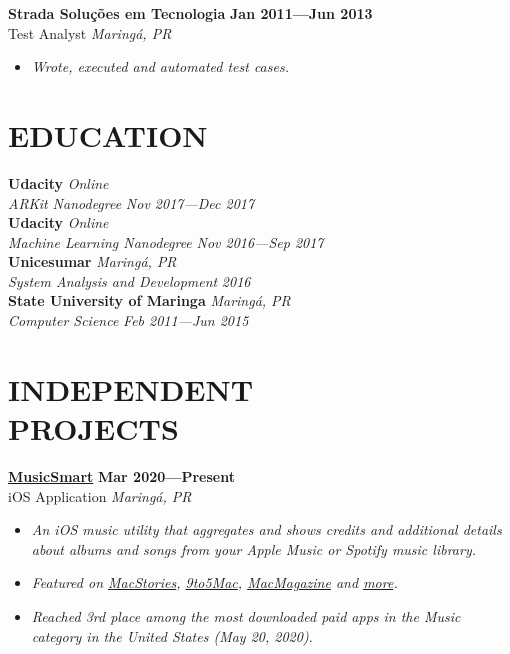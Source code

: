 \documentclass[line,margin]{res}
\begin{document}
\begin{resume}
  {\bf Strada Solu\c{c}\~oes em Tecnologia} \hfill {\bf Jan 2011---Jun 2013} \\
  Test Analyst \hfill {\sl Maring\'a, PR}\\[-6pt]
    \begin{itemize}
    \item {\sl Wrote, executed and automated test cases.}
  \end{itemize}


\section{EDUCATION}
  {\bf Udacity} \hfill {\sl Online} \\
  {\sl ARKit Nanodegree} \hfill {\sl Nov 2017---Dec 2017}\\[6pt]
  {\bf Udacity} \hfill {\sl Online} \\
  {\sl Machine Learning Nanodegree} \hfill {\sl Nov 2016---Sep 2017}\\[6pt]
  {\bf Unicesumar} \hfill {\sl Maring\'a, PR} \\
  {\sl System Analysis and Development} \hfill {\sl 2016}\\[6pt]
  {\bf State University of Maringa} \hfill {\sl Maring\'a, PR} \\
  {\sl Computer Science} \hfill {\sl Feb 2011---Jun 2015}


\section{INDEPENDENT \\ PROJECTS}
  {\bf \href{https://apps.apple.com/us/app/musicsmart/id1512195368}{MusicSmart}} \hfill {\bf Mar 2020---Present} \\
  iOS Application \hfill {\sl Maring\'a, PR}\\[-6pt]
    \begin{itemize}
    \item {\sl An iOS music utility that aggregates and shows credits and additional details about albums and songs from your Apple Music or Spotify music library.}
    \item {\sl Featured on \href{https://www.macstories.net/reviews/musicsmart-puts-the-spotlight-on-music-credits/}{MacStories}, \href{https://9to5mac.com/2020/05/19/musicsmart-apple-music-app/}{9to5Mac}, \href{https://macmagazine.uol.com.br/post/2020/05/21/aplicativo-brasileiro-musicsmart-traz-detalhes-aprofundados-sobre-as-cancoes-do-apple-music/}{MacMagazine} and \href{https://twitter.com/chockenberry/status/1262803700658999296}{more}.}
    \item {\sl Reached 3rd place among the most downloaded paid apps in the Music category in the United States (May 20, 2020).}
    \end{itemize}
  

\end{resume}
\end{document}
